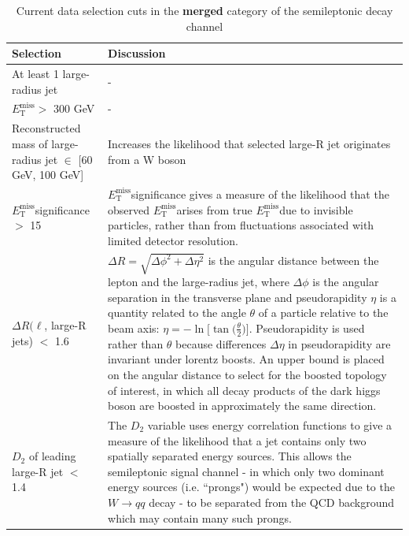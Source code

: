 \documentclass[12pt]{article}
\newcommand*{\met}{\ensuremath{E_\text{T}^\text{miss}}}
\begin{document}
\begin{table}[H]
\centering
\caption{Current data selection cuts in the \textbf{merged} category of the semileptonic decay channel}
\label{tab:merged_cuts}
\begin{footnotesize}
\renewcommand{\arraystretch}{1.5}
\begin{tabular}{|p{50mm}|p{100mm}|}
\hline
\textbf{Selection} & \textbf{Discussion}  \\ \hline
At least 1 large-radius jet & -      \\ \hline
\met $>$ 300 GeV      & -      \\ \hline
Reconstructed mass of large-radius jet $\in$ [60 GeV, 100 GeV]     & Increases the likelihood that selected large-R jet originates from a W boson        \\ \hline
\met significance $>$ 15    & \met significance gives a measure of the likelihood that the observed \met arises from true \met due to invisible particles, rather than from fluctuations associated with limited detector resolution.        \\ \hline
$\Delta R(\ell$, large-R jets) $<$ 1.6    & $\Delta R = \sqrt{\Delta\phi^2+\Delta\eta^2}$ is the angular distance between the lepton and the large-radius jet, where $\Delta\phi$ is the angular separation in the transverse plane and pseudorapidity $\eta$ is a quantity related to the angle $\theta$ of a particle relative to the beam axis: $\eta=-\ln\Big[\tan\Big(\frac{\theta}{2}\Big)\Big]$. Pseudorapidity is used rather than $\theta$ because differences $\Delta\eta$ in pseudorapidity are invariant under lorentz boosts. An upper bound is placed on the angular distance to select for the boosted topology of interest, in which all decay products of the dark higgs boson are boosted in approximately the same direction.      \\ \hline
$D_{2}$ of leading large-R jet $<$ 1.4   & The $D_{2}$ variable \cite{Marzani_2019} uses energy correlation functions to give a measure of the likelihood that a jet contains only two spatially separated energy sources. This allows the semileptonic signal channel - in which only two dominant energy sources (i.e. ``prongs") would be expected due to the $W\rightarrow qq$ decay - to be separated from the QCD background which may contain many such prongs.     \\ \hline
\end{tabular}
\end{footnotesize}
\end{table}
\end{document}
